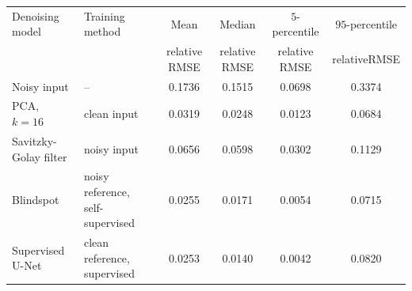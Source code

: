 
\begin{tabular}{llcccc}
\hline
Denoising model & Training method & Mean          & Median        & $5$-percentile & $95$-percentile \\
                &                 & relative RMSE & relative RMSE & relative RMSE  & relativeRMSE \\
\hline
Noisy input & -- &
    0.1736 &
    0.1515 &
    0.0698 &
    0.3374 \\
PCA, $k\!=\!16$ & clean input &
    0.0319 &
    0.0248 &
    0.0123 &
    0.0684 \\
Savitzky-Golay filter & noisy input &
    0.0656 &
    0.0598 &
    0.0302 &
    0.1129 \\
Blindspot & noisy reference, self-supervised &
    0.0255 &
    0.0171 &
    0.0054 &
    0.0715 \\
Supervised U-Net & clean reference, supervised &
    0.0253 &
    0.0140 &
    0.0042 &
    0.0820 \\
\hline
\end{tabular}
